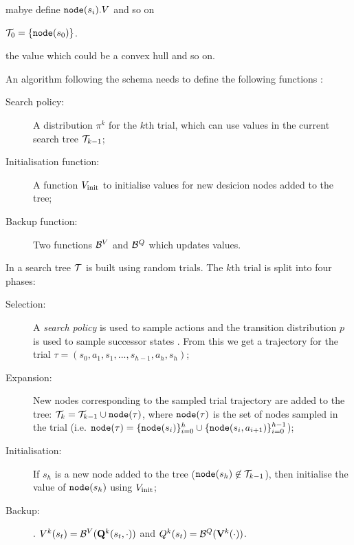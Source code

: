          mabye define ${\textnormal{\texttt{node}}}(s_i).V$ and so on


         $\mathcal{T}_0=\{{\textnormal{\texttt{node}}}(s_0)\}$.

         the value which could be a convex hull and so on. 

        An algorithm following the \thtspp\ewe schema needs to define the following functions :
        \begin{description}
            \item[Search policy:]
                A distribution  $\pi^{k}$ for the $k$th trial, which can use values in the current search tree $\mathcal{T}_{k-1}$;
            \item[Initialisation function:]
                A function $V_{\text{init}}$ to initialise values for new desicion nodes added to the tree;
            \item[Backup function:]
                Two functions $\mathcal{B}^V$ and $\mathcal{B}^Q$ which updates values. 

        \end{description}

        In \thtspp\ewe a search tree $\mathcal{T}$ is built using random trials. The $k$th trial is split into four phases:
        
        \begin{description}
            \item[Selection:] 
                A \textit{search policy} is used to sample actions and the transition distribution $p$ is used to sample successor states . From this we get a trajectory for the trial $\tau=(s_0,a_1,s_1,...,s_{h-1},a_h,s_h)$;
            \item[Expansion:]
                New nodes corresponding to the sampled trial trajectory are added to the tree: $\mathcal{T}_k = \mathcal{T}_{k-1} \cup {\textnormal{\texttt{node}}}(\tau)$, where ${\textnormal{\texttt{node}}}(\tau)$ is the set of nodes sampled in the trial (i.e. ${\textnormal{\texttt{node}}}(\tau) = \{{\textnormal{\texttt{node}}}(s_i)\}_{i=0}^h \cup \{{\textnormal{\texttt{node}}}(s_i,a_{i+1})\}_{i=0}^{h-1}$);
            \item[Initialisation:]
                If $s_h$ is a new node added to the tree (${\textnormal{\texttt{node}}}(s_h)\not\in\mathcal{T}_{k-1}$), then initialise the value of ${\textnormal{\texttt{node}}}(s_h)$ using $V_{\text{init}}$;
            \item[Backup:]
                . $V^{k}(s_t) = \mathcal{B}^V(\mathbf{Q}^{k}(s_t,\cdot))$ and $Q^{k}(s_t) = \mathcal{B}^Q(\mathbf{V}^{k}(\cdot))$.
        \end{description}


